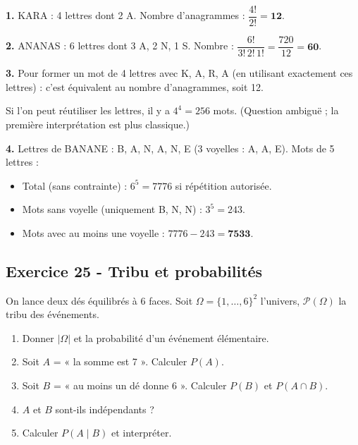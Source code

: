 \documentclass[12pt,a4paper]{article}
\begin{document}
\begin{boitecorrige}
\textbf{1.} \textsc{KARA} : 4 lettres dont 2 A. Nombre d'anagrammes : $\dfrac{4!}{2!} = \mathbf{12}$.

\textbf{2.} \textsc{ANANAS} : 6 lettres dont 3 A, 2 N, 1 S. Nombre : $\dfrac{6!}{3!\,2!\,1!} = \dfrac{720}{12} = \mathbf{60}$.

\textbf{3.} Pour former un mot de 4 lettres avec K, A, R, A (en utilisant exactement ces lettres) : c'est équivalent au nombre d'anagrammes, soit 12.

Si l'on peut réutiliser les lettres, il y a $4^4 = 256$ mots. (Question ambiguë ; la première interprétation est plus classique.)

\textbf{4.} Lettres de \textsc{BANANE} : B, A, N, A, N, E (3 voyelles : A, A, E). Mots de 5 lettres :
\begin{itemize}[nosep]
  \item Total (sans contrainte) : $6^5 = 7776$ si répétition autorisée.
  \item Mots sans voyelle (uniquement B, N, N) : $3^5 = 243$.
  \item Mots avec au moins une voyelle : $7776 - 243 = \mathbf{7533}$.
\end{itemize}
\end{boitecorrige}

\subsection*{Exercice 25 - Tribu et probabilités \niveau{\difficile}}

\begin{boiteexercice}
On lance deux dés équilibrés à 6 faces. Soit $\Omega = \{1,\ldots,6\}^2$ l'univers, $\mathcal{P}(\Omega)$ la tribu des événements.
\begin{enumerate}
  \item Donner $|\Omega|$ et la probabilité d'un événement élémentaire.
  \item Soit $A$ = « la somme est 7 ». Calculer $P(A)$.
  \item Soit $B$ = « au moins un dé donne 6 ». Calculer $P(B)$ et $P(A\cap B)$.
  \item $A$ et $B$ sont-ils indépendants ?
  \item Calculer $P(A\mid B)$ et interpréter.
\end{enumerate}
\end{boiteexercice}
\end{document}
